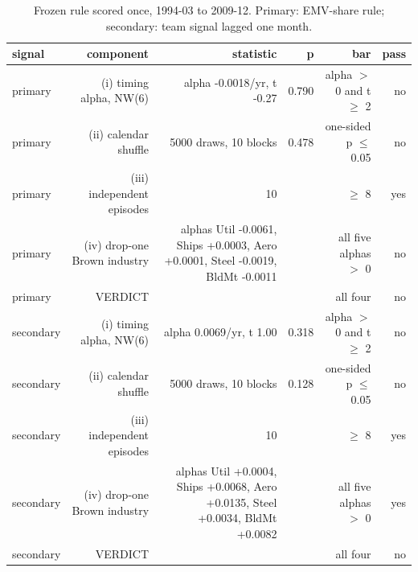 \begin{table}[htbp]\centering\small
\caption{Frozen rule scored once, 1994-03 to 2009-12. Primary: EMV-share rule; secondary: team signal lagged one month.}
\label{tab:m8_passbar}
\begin{tabular}{lrrrrr}
\toprule
signal & component & statistic & p & bar & pass \\
\midrule
primary & (i) timing alpha, NW(6) & alpha -0.0018/yr, t -0.27 & 0.790 & alpha $>$ 0 and t $\geq$ 2 & no \\
primary & (ii) calendar shuffle & 5000 draws, 10 blocks & 0.478 & one-sided p $\leq$ 0.05 & no \\
primary & (iii) independent episodes & 10 &  & $\geq$ 8 & yes \\
primary & (iv) drop-one Brown industry & alphas Util -0.0061, Ships +0.0003, Aero +0.0001, Steel -0.0019, BldMt -0.0011 &  & all five alphas $>$ 0 & no \\
primary & VERDICT &  &  & all four & no \\
secondary & (i) timing alpha, NW(6) & alpha 0.0069/yr, t 1.00 & 0.318 & alpha $>$ 0 and t $\geq$ 2 & no \\
secondary & (ii) calendar shuffle & 5000 draws, 10 blocks & 0.128 & one-sided p $\leq$ 0.05 & no \\
secondary & (iii) independent episodes & 10 &  & $\geq$ 8 & yes \\
secondary & (iv) drop-one Brown industry & alphas Util +0.0004, Ships +0.0068, Aero +0.0135, Steel +0.0034, BldMt +0.0082 &  & all five alphas $>$ 0 & yes \\
secondary & VERDICT &  &  & all four & no \\
\bottomrule
\end{tabular}
\end{table}
